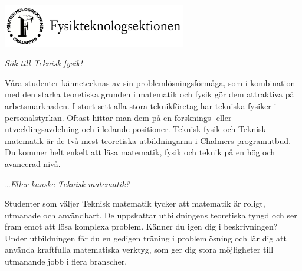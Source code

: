 
\begin{center}
\includegraphics[width = 0.6\textwidth]{Bilder/Loggor/Flogga.png}
\end{center}

\begingroup
\fontsize{12}{13}\selectfont
{}\baselineskip

\begin{adjustwidth}{14pt}{14pt}
{\it Sök till Teknisk fysik!}


Våra studenter kännetecknas av sin problemlösningsförmåga, som i
kombination med den starka teoretiska grunden i matematik och fysik gör dem
attraktiva på arbetsmarknaden. I stort sett alla stora teknikföretag har
tekniska fysiker i personalstyrkan. Oftast hittar man dem på en forsknings-
eller utvecklingsavdelning och i ledande positioner. Teknisk fysik och
Teknisk matematik är de två mest teoretiska utbildningarna i Chalmers
programutbud. Du kommer helt enkelt att läsa matematik, fysik och teknik på
en hög och avancerad nivå.


{\it \dots Eller kanske Teknisk matematik?}


Studenter som väljer Teknisk matematik tycker att matematik är roligt,
utmanade och användbart. De uppskattar utbildningens teoretiska tyngd och
ser fram emot att lösa komplexa problem. Känner du igen dig i
beskrivningen? Under utbildningen får du en gedigen träning i
problemlösning och lär dig att använda kraftfulla matematiska verktyg, som
ger dig stora möjligheter till utmanande jobb i flera branscher.

\end{adjustwidth}
\endgroup